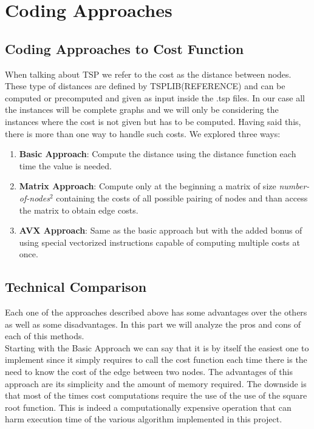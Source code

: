 \chapter{Coding Approaches}

\section{Coding Approaches to Cost Function}

When talking about TSP we refer to the cost as the distance between nodes. These type of distances are defined by TSPLIB(REFERENCE) and can be computed or precomputed and given as input inside the .tsp files. In our case all the instances will be complete graphs and we will only be considering the instances where the cost is not given but has to be computed. Having said this, there is more than one way to handle such costs. We explored three ways:

\begin{enumerate}
	\item \textbf{Basic Approach}: Compute the distance using the distance function each time the value is needed.
	\item \textbf{Matrix Approach}: Compute only at the beginning a matrix of size \textit{number-of-nodes}$^2$ containing the costs of all possible pairing of nodes and than access the matrix to obtain edge costs.
	\item \textbf{AVX Approach}: Same as the basic approach but with the added bonus of using special vectorized instructions capable of computing multiple costs at once.
\end{enumerate}

\section{Technical Comparison}

Each one of the approaches described above has some advantages over the others as well as some disadvantages. In this part we will analyze the pros and cons of each of this methods. \\
Starting with the Basic Approach we can say that it is by itself the easiest one to implement since it simply requires to call the cost function each time there is the need to know the cost of the edge between two nodes. The advantages of this approach are its simplicity and the amount of memory required. The downside is that most of the times cost computations require the use of the use of the square root function. This is indeed a computationally expensive operation that can harm execution time of the various algorithm implemented in this project.

